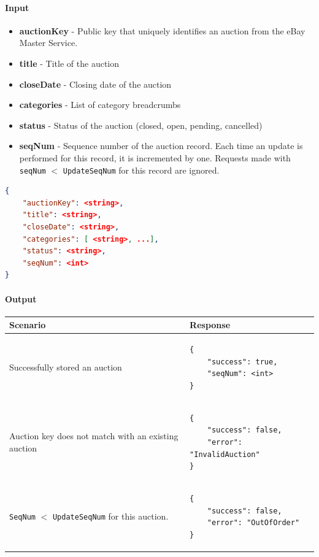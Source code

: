 \documentclass[12pt,a4paper]{article}
\begin{document}
\paragraph{Input}

\begin{itemize}
    \item \textbf{auctionKey} - Public key that uniquely identifies an auction from the eBay Master Service.
    \item \textbf{title} - Title of the auction 
    \item \textbf{closeDate} - Closing date of the auction 
    \item \textbf{categories} -  List of category breadcrumbs
    \item \textbf{status} - Status of the auction (closed, open, pending, cancelled)
    \item \textbf{seqNum} - Sequence number of the auction record. Each time an update is performed for this record,
        it is incremented by one. Requests made with \texttt{seqNum} $<$ \texttt{UpdateSeqNum} for this record are ignored.
\end{itemize}
\begin{lstlisting}[language=json,numbers=none]
{
    "auctionKey": <string>,
    "title": <string>,
    "closeDate": <string>,
    "categories": [ <string>, ...],
    "status": <string>,
    "seqNum": <int>
}
\end{lstlisting}

\paragraph{Output}
\begin{center}
    \begin{tabular}{| p{6cm} | l |}
        \hline
        \textbf{Scenario} & \textbf{Response} \\
        \hline
        Successfully stored an auction & 
        \begin{lstlisting}[language=tableJson,firstnumber=1]
{
    "success": true,
    "seqNum": <int>           
}

        \end{lstlisting} \\ 
        \hline
        Auction key does not match with an existing auction & 
        \begin{lstlisting}[language=tableJson,firstnumber=1]
{
    "success": false,
    "error": "InvalidAuction"
}

        \end{lstlisting} \\ 
        \hline
        \texttt{SeqNum} $<$ \texttt{UpdateSeqNum} for this auction. & 
        \begin{lstlisting}[language=tableJson,firstnumber=1]
{
    "success": false,
    "error": "OutOfOrder"
}

        \end{lstlisting} \\ 
        \hline
    \end{tabular}
\end{center}
\end{document}
